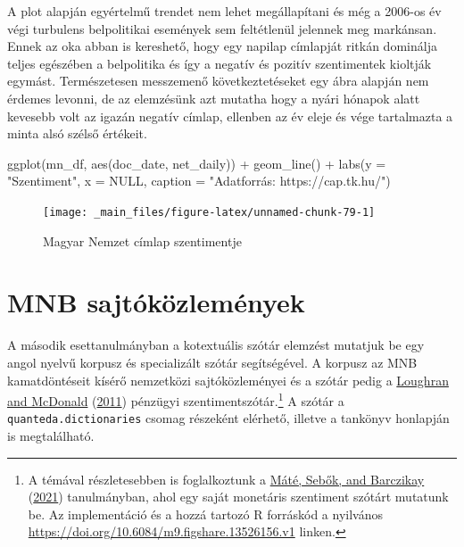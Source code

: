 \documentclass[
]{book}
\newenvironment{Shaded}{\begin{snugshade}}{\end{snugshade}}
\newcommand{\AttributeTok}[1]{\textcolor[rgb]{0.77,0.63,0.00}{#1}}
\newcommand{\ConstantTok}[1]{\textcolor[rgb]{0.00,0.00,0.00}{#1}}
\newcommand{\FunctionTok}[1]{\textcolor[rgb]{0.00,0.00,0.00}{#1}}
\newcommand{\NormalTok}[1]{#1}
\newcommand{\SpecialCharTok}[1]{\textcolor[rgb]{0.00,0.00,0.00}{#1}}
\newcommand{\StringTok}[1]{\textcolor[rgb]{0.31,0.60,0.02}{#1}}
\begin{document}
A plot alapján egyértelmű trendet nem lehet megállapítani és még a
2006-os év végi turbulens belpolitikai események sem feltétlenül
jelennek meg markánsan. Ennek az oka abban is kereshető, hogy egy
napilap címlapját ritkán dominálja teljes egészében a belpolitika és így
a negatív és pozitív szentimentek kioltják egymást. Természetesen
messzemenő következtetéseket egy ábra alapján nem érdemes levonni, de az
elemzésünk azt mutatha hogy a nyári hónapok alatt kevesebb volt az
igazán negatív címlap, ellenben az év eleje és vége tartalmazta a minta
alsó szélső értékeit.

\begin{Shaded}
\begin{Highlighting}[]
\FunctionTok{ggplot}\NormalTok{(mn\_df, }\FunctionTok{aes}\NormalTok{(doc\_date, net\_daily)) }\SpecialCharTok{+} \FunctionTok{geom\_line}\NormalTok{() }\SpecialCharTok{+} \FunctionTok{labs}\NormalTok{(}\AttributeTok{y =} \StringTok{"Szentiment"}\NormalTok{, }\AttributeTok{x =} \ConstantTok{NULL}\NormalTok{, }
    \AttributeTok{caption =} \StringTok{"Adatforrás: https://cap.tk.hu/"}\NormalTok{)}
\end{Highlighting}
\end{Shaded}

\begin{figure}

{\centering \texttt{[image: \_main\_files/figure-latex/unnamed-chunk-79-1]} 

}

\caption{Magyar Nemzet címlap szentimentje}\label{fig:unnamed-chunk-79}
\end{figure}

\hypertarget{mnb-sajtuxf3kuxf6zlemuxe9nyek}{%
\section{MNB sajtóközlemények}\label{mnb-sajtuxf3kuxf6zlemuxe9nyek}}

A második esettanulmányban a kotextuális szótár elemzést mutatjuk be egy
angol nyelvű korpusz és specializált szótár segítségével. A korpusz az
MNB kamatdöntéseit kísérő nemzetközi sajtóközleményei és a szótár pedig
a \protect\hyperlink{ref-loughran2011}{Loughran and McDonald}
(\protect\hyperlink{ref-loughran2011}{2011}) pénzügyi
szentimentszótár.\footnote{A témával részletesebben is foglalkoztunk a
  \protect\hyperlink{ref-muxe1tuxe92021}{Máté, Sebők, and Barczikay}
  (\protect\hyperlink{ref-muxe1tuxe92021}{2021}) tanulmányban, ahol egy
  saját monetáris szentiment szótárt mutatunk be. Az implementáció és a
  hozzá tartozó R forráskód a nyilvános
  \url{https://doi.org/10.6084/m9.figshare.13526156.v1} linken.} A
szótár a \texttt{quanteda.dictionaries} csomag részeként elérhető,
illetve a tankönyv honlapján is megtalálható.
\end{document}
